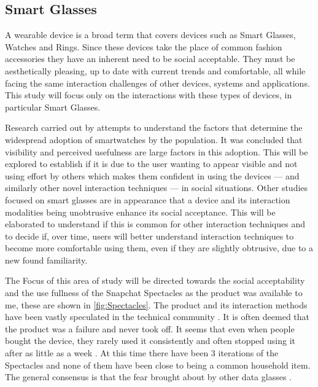 \documentclass{l4proj}
\begin{document}
\subsection{Smart Glasses}

A wearable device is a broad term that covers devices such as Smart Glasses, Watches and Rings. Since these devices take the place of common fashion accessories they have an inherent need to be social acceptable. They must be  aesthetically pleasing, up to date with current trends and comfortable, all while facing the same interaction challenges of other devices, systems and applications. This study will focus only on the interactions with these types of devices, in particular Smart Glasses.

Research carried out by \citet{chuah_wearable_2016} attempts to understand the factors that determine the widespread adoption of smartwatches by the population. It was concluded that visibility and perceived usefulness are large factors in this adoption. This will be explored to establish if it is due to the user wanting to appear visible and not using effort by others which makes them confident in using the devices --- and similarly other novel interaction techniques --- in social situations. Other studies focused on smart glasses are in appearance that a device and its interaction modalities being unobtrusive enhance its social acceptance. This will be elaborated to understand if this is common for other interaction techniques and to decide if, over time, users will better understand interaction techniques to become more comfortable using them, even if they are slightly obtrusive, due to a new found familiarity.

The Focus of this area of study will be directed towards the social acceptability and the use fullness of the Snapchat Spectacles as the product was available to me, these are shown in \autoref{fig:Spectacles}. The product and its interaction methods have been vastly speculated in the technical community \citep{constine_why_2017}. It is often deemed that the product was a failure and never took off. It seems that even when people bought the device, they rarely used it consistently and often stopped using it after as little as a week \citep{constine_why_2017}. At this time there have been 3 iterations of the Spectacles and none of them have been close to being a common household item. The general consensus is that the fear brought about by other data glasses \citep{koelle_dont_2015}.
\end{document}
